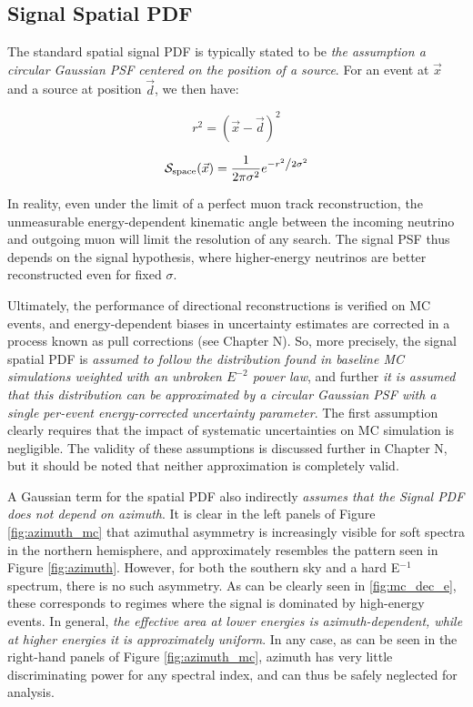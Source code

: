 \subsection{Signal Spatial PDF}

The standard spatial signal PDF is typically stated to be \emph{the assumption a circular Gaussian PSF centered on the position of a source}. For an event at $\vec{x}$ and a source at position $\vec{d}$, we then have:

\begin{equation}
r^{2} =  (\vec{x}- \vec{d})^{2}
\end{equation}

\begin{equation}
\mathcal{S}_{\textup{space}} (\vec{x}) = \frac{1}{{2\pi\sigma^{2} }}e^{{{ - r^{2}  } \mathord{\left/ {\vphantom {{ - \left( {x - \mu } \right)^2 } {2\sigma ^2 }}} \right. \kern-\nulldelimiterspace} {2\sigma ^2 }}}
\end{equation}

In reality, even under the limit of a perfect muon track reconstruction, the unmeasurable energy-dependent kinematic angle between the incoming neutrino and outgoing muon will limit the resolution of any search. The signal PSF thus depends on the signal hypothesis, where higher-energy neutrinos are better reconstructed even for fixed $\sigma$. 

Ultimately, the performance of directional reconstructions is verified on MC events, and energy-dependent biases in uncertainty estimates are corrected in a process known as pull corrections (see Chapter N). So, more precisely, the signal spatial PDF is \emph{assumed to follow the distribution found in baseline MC simulations weighted with an unbroken $E^{-2}$ power law}, and further \emph{it is assumed that this distribution can be approximated by a circular Gaussian PSF with a single per-event energy-corrected uncertainty parameter}. The first assumption clearly requires that the impact of systematic uncertainties on MC simulation is negligible. The validity of these assumptions is discussed further in Chapter N, but it should be noted that neither approximation is completely valid. 

A Gaussian term for the spatial PDF also indirectly \emph{assumes that the Signal PDF does not depend on azimuth}. It is clear in the left panels of Figure \ref{fig:azimuth_mc} that azimuthal asymmetry is increasingly visible for soft spectra in the northern hemisphere, and approximately  resembles the pattern seen in Figure \ref{fig:azimuth}. However, for both the southern sky and a hard E$^{-1}$ spectrum, there is no such asymmetry. As can be clearly seen in \ref{fig:mc_dec_e}, these corresponds to regimes where the signal is dominated by high-energy events. In general, \emph{the effective area at lower energies is azimuth-dependent, while at higher energies it is approximately uniform}. In any case, as can be seen in the right-hand panels of Figure \ref{fig:azimuth_mc}, azimuth has very little discriminating power for any spectral index, and can thus be safely neglected for analysis.

